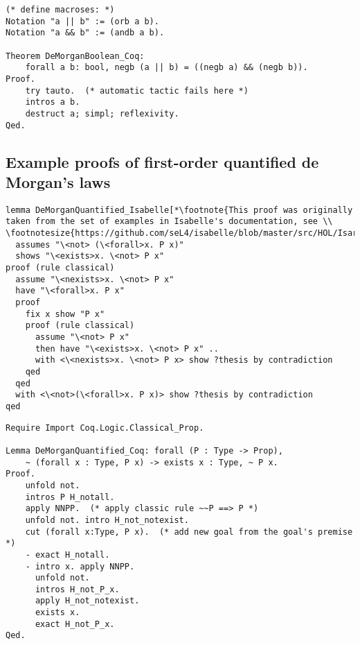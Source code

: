 \documentclass[article]{aaltoseries}
\begin{document}
\begin{lstlisting}[language=coq,caption={Proof of the de Morgan's law for booleans in Coq}, label={ex_morgan_bool_coq}]
(* define macroses: *)
Notation "a || b" := (orb a b).
Notation "a && b" := (andb a b).

Theorem DeMorganBoolean_Coq:
    forall a b: bool, negb (a || b) = ((negb a) && (negb b)).
Proof.
    try tauto.  (* automatic tactic fails here *)
    intros a b.
    destruct a; simpl; reflexivity.
Qed.
\end{lstlisting}


\subsection{Example proofs of first-order quantified de Morgan's laws}
\label{apx:morgan_firstorder}

\begin{lstlisting}[language=isabelle, caption={Proof of the de Morgan's law for first-order propositions in Isabelle}, label={ex_morgan_quant_isabelle}]
lemma DeMorganQuantified_Isabelle[*\footnote{This proof was originally taken from the set of examples in Isabelle's documentation, see \\ \footnotesize{https://github.com/seL4/isabelle/blob/master/src/HOL/Isar\_Examples/Drinker.thy}}*]:
  assumes "\<not> (\<forall>x. P x)"
  shows "\<exists>x. \<not> P x"
proof (rule classical)
  assume "\<nexists>x. \<not> P x"
  have "\<forall>x. P x"
  proof
    fix x show "P x"
    proof (rule classical)
      assume "\<not> P x"
      then have "\<exists>x. \<not> P x" ..
      with <\<nexists>x. \<not> P x> show ?thesis by contradiction
    qed
  qed
  with <\<not>(\<forall>x. P x)> show ?thesis by contradiction
qed
\end{lstlisting}


\begin{lstlisting}[language=coq, caption={Proof of the de Morgan's law for first-order propositions in Coq}, label={ex_morgan_quant_coq}]
Require Import Coq.Logic.Classical_Prop.

Lemma DeMorganQuantified_Coq: forall (P : Type -> Prop), 
    ~ (forall x : Type, P x) -> exists x : Type, ~ P x.
Proof.
    unfold not.
    intros P H_notall.
    apply NNPP.  (* apply classic rule ~~P ==> P *)
    unfold not. intro H_not_notexist.
    cut (forall x:Type, P x).  (* add new goal from the goal's premise *)
    - exact H_notall.
    - intro x. apply NNPP.
      unfold not.
      intros H_not_P_x.
      apply H_not_notexist.
      exists x.
      exact H_not_P_x.
Qed.
\end{lstlisting}
\end{document}

